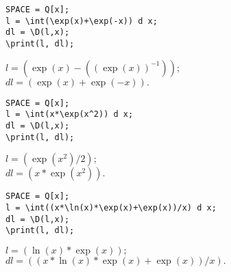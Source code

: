 \begin{verbatim}
SPACE = Q[x];
l = \int(\exp(x)+\exp(-x)) d x;
dl = \D(l,x);
\print(l, dl);
\end{verbatim}
\vspace*{-3mm}

{
$l = (\exp(x)-((\exp(x))^{-1})); $\\
\hspace*{4mm} $dl = (\exp(x)+\exp(-x)). $
}

\begin{verbatim}
SPACE = Q[x];
l = \int(x*\exp(x^2)) d x;
dl = \D(l,x);
\print(l, dl);
\end{verbatim}
\vspace*{-3mm}

{
$l = (\exp(x^2)/2); $\\
\hspace*{4mm} $dl = (x*\exp(x^2)). $
}

\begin{verbatim}
SPACE = Q[x];
l = \int((x*\ln(x)*\exp(x)+\exp(x))/x) d x;
dl = \D(l,x);
\print(l, dl);
\end{verbatim}
\vspace*{-3mm}

{
$l = (\ln(x)*\exp(x)); $\\
\hspace*{4mm} $dl = ((x*\ln(x)*\exp(x)+\exp(x))/x). $
}


